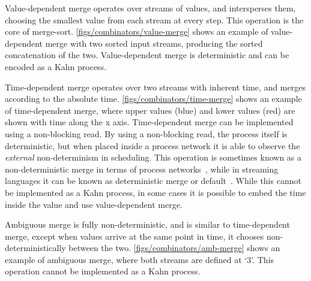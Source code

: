 
Value-dependent merge operates over streams of values, and intersperses them, choosing the smallest value from each stream at every step.
This operation is the core of merge-sort.
\autoref{figs/combinators/value-merge} shows an example of value-dependent merge with two sorted input streams, producing the sorted concatenation of the two.
Value-dependent merge is deterministic and can be encoded as a Kahn process.


Time-dependent merge operates over two streams with inherent time, and merges according to the absolute time.
\autoref{figs/combinators/time-merge} shows an example of time-dependent merge, where upper values (blue) and lower values (red) are shown with time along the x axis.
Time-dependent merge can be implemented using a non-blocking read.
By using a non-blocking read, the process itself is deterministic, but when placed inside a process network it is able to observe the \emph{external} non-determinism in scheduling.
This operation is sometimes known as a non-deterministic merge in terms of process networks~\citep{brock1981scenarios}, while in streaming languages it can be known as deterministic merge or default~\citep{amagbegnon1995implementation}.
While this cannot be implemented as a Kahn process, in some cases it is possible to embed the time inside the value and use value-dependent merge.


Ambiguous merge is fully non-deterministic, and is similar to time-dependent merge, except when values arrive at the same point in time, it chooses non-deterministically between the two.
\autoref{figs/combinators/amb-merge} shows an example of ambiguous merge, where both streams are defined at `3'.
This operation cannot be implemented as a Kahn process.

